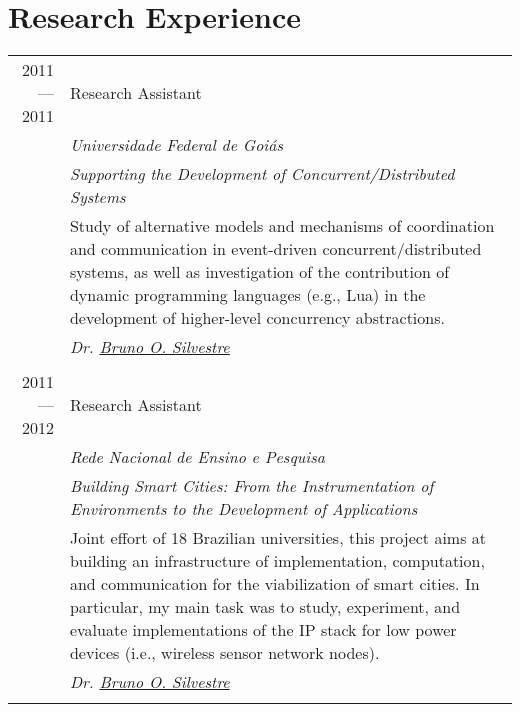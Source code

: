 \documentclass[a4paper,10pt]{article}
\begin{document}
\section{Research Experience}
\begin{tabular}{r|p{11cm}}

  \textsc{2011---2011}
  & Research Assistant \\
  &\emph{Universidade Federal de Goiás}\\
  &\emph{Supporting the Development of Concurrent/Distributed Systems}\\
  &\indent \footnotesize{Study of alternative models and mechanisms of coordination and communication in event-driven
    concurrent/distributed systems, as well as investigation of the contribution of dynamic programming 
    languages (e.g., Lua) in the development of higher-level concurrency abstractions.}\\
  &\emph{Dr. \href{http://inf.ufg.br/~brunoos/}{Bruno O. Silvestre}}
  \\\multicolumn{2}{c}{} \\

  \textsc{2011---2012}
  & Research Assistant \\
  &\emph{Rede Nacional de Ensino e Pesquisa}\\
  &\emph{Building Smart Cities: From the Instrumentation of Environments to the Development of Applications}\\
  &\footnotesize{Joint effort of 18 Brazilian universities, this project aims at building an infrastructure of 
    implementation, computation, and communication for the viabilization of smart cities. In particular, my main
    task was to study, experiment, and evaluate implementations of the IP stack for low power devices (i.e., 
    wireless sensor network nodes).}\\
  &\emph{Dr. \href{http://inf.ufg.br/~brunoos/}{Bruno O. Silvestre}}
  \\\multicolumn{2}{c}{} \\

\end{tabular}

\nocite{salazar:1}

\renewcommand\refname{Publications} 



\end{document}
